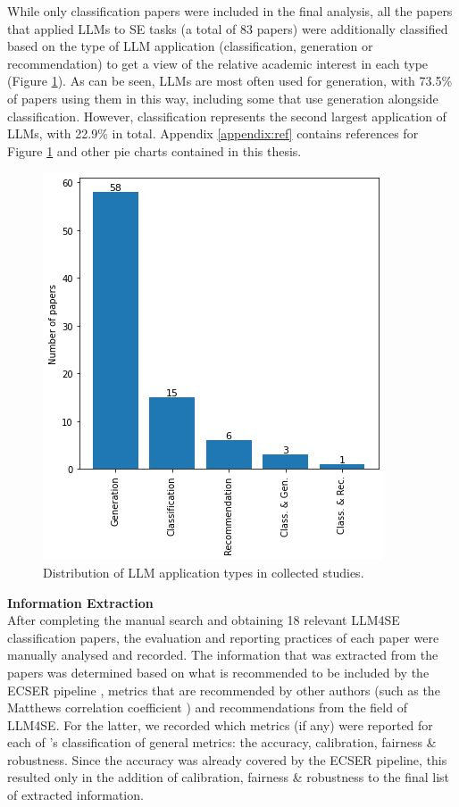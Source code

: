 \documentclass[a4paper]{article}
\begin{document}
While only classification papers were included in the final analysis, all the papers that applied LLMs to SE tasks (a total of 83 papers) were additionally classified based on the type of LLM application (classification, generation or recommendation) to get a view of the relative academic interest in each type (Figure \ref{fig:LLMTypes}). As can be seen, LLMs are most often used for generation, with 73.5\% of papers using them in this way, including some that use generation alongside classification. However, classification represents the second largest application of LLMs, with 22.9\% in total. Appendix \ref{appendix:ref} contains references for Figure \ref{fig:LLMTypes} and other pie charts contained in this thesis.

\begin{figure}[h]
	\centering
	\captionsetup{justification=centering}
	\includegraphics[width=0.5\linewidth]{figures/LLMTypes.png}
	\caption{Distribution of LLM application types in collected studies.}
	\label{fig:LLMTypes}
\end{figure}


\textbf{Information Extraction}\\
After completing the manual search and obtaining 18 relevant LLM4SE classification papers, the evaluation and reporting practices of each paper were manually analysed and recorded. The information that was extracted from the papers was determined based on what is recommended to be included by the ECSER pipeline \cite{Dellanna2022}, metrics that are recommended by other authors (such as the Matthews correlation coefficient \cite{Chicco2020,Foody2023,Yao2020}) and recommendations from the field of LLM4SE. For the latter, we recorded which metrics (if any) were reported for each of \textcite{chang2023}'s classification of general metrics: the accuracy, calibration, fairness \& robustness. Since the accuracy was already covered by the ECSER pipeline, this resulted only in the addition of calibration, fairness \& robustness to the final list of extracted information.
\end{document}
